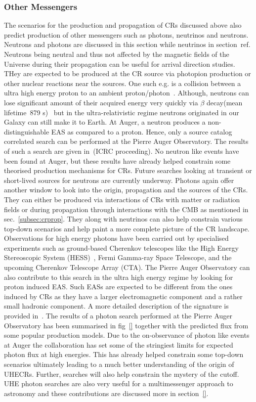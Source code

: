 \subsubsection*{Other Messengers}
\label{subsubsec:CRmessengers}
The scenarios for the production and propagation of CRs discussed above also predict production of other messengers such as photons, neutrinos and neutrons. Neutrons and photons are discussed in this section while neutrinos in section~ref{}. 
Neutrons being neutral and thus not affected by the magnetic fields of the Universe during their propagation can be useful for arrival direction studies. THey are expected to be produced at the CR source via photopion production or other nuclear reactions near the sources. One such e.g. is a collision between a ultra high energy proton to an ambient proton/photon~\cite{}. Although, neutrons can lose significant amount of their acquired energy very quickly via $\beta$ decay(mean lifetime~879 s)~\cite{} but in the ultra-relativistic regime neutrons originated in our Galaxy can still make it to Earth. At Auger, a neutron produces a non-distinguishable EAS as compared to a proton. Hence, only a source catalog correlated search can be performed at the Pierre Auger Observatory. The results of such a search are given in~\cite{}(ICRC proceeding). No neutron like events have been found at Auger, but these results have already helped constrain some theorised production mechanisms for CRs. Future searches looking at transient or short-lived sources for neutrons are currently underway. 
Photons again offer another window to look into the origin, propagation and the sources of the CRs. They can either be produced via interactions of CRs with matter or radiation fields or during propagation through interactions with the CMB as mentioned in sec.~\ref{subsec:crprop}. They along with neutrinos can also help constrain various top-down scenarios and help paint a more complete picture of the CR landscape. Observations for high energy photons have been carried out by specialised experiments such as ground-based Cherenkov telescopes like the High Energy Stereoscopic System (HESS)~\cite{}, Fermi Gamma-ray Space Telescope, and the upcoming Cherenkov Telescope Array (CTA). The Pierre Auger Observatory can also contribute to this search in the ultra high energy regime by looking for proton induced EAS. Such EASs are expected to be different from the ones induced by CRs as they have a larger electromagnetic component and a rather small hadronic component. A more detailed description of the signature is provided in~\cite{}. The results of a photon search performed at the Pierre Auger Observatory has been summarised in fig~\ref{} together with the predicted flux from some popular production models. Due to the on-observance of photon like events at Auger the collaboration has set some of the stringiest limits for expected photon flux at high energies. This has already helped constrain some top-down scenarios ultimately leading to a much better understanding of the origin of UHECRs. Further, searches will also help constrain the mystery of the cutoff. UHE photon searches are also very useful for a multimessenger approach to astronomy and these contributions are discussed more in section~\ref{}.


